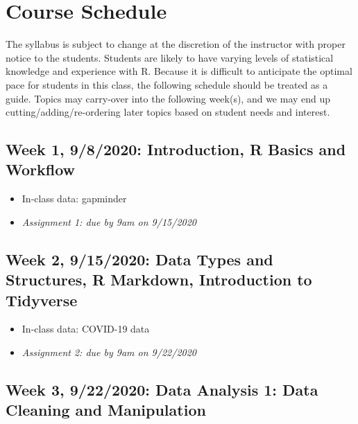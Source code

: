 \documentclass[11pt,]{article}
\providecommand{\tightlist}{%
  \setlength{\itemsep}{0pt}\setlength{\parskip}{0pt}}
\begin{document}
\hypertarget{course-schedule}{%
\section{Course Schedule}\label{course-schedule}}

The syllabus is subject to change at the discretion of the instructor
with proper notice to the students. Students are likely to have varying
levels of statistical knowledge and experience with R. Because it is
difficult to anticipate the optimal pace for students in this class, the
following schedule should be treated as a guide. Topics may carry-over
into the following week(s), and we may end up cutting/adding/re-ordering
later topics based on student needs and interest.

\hypertarget{week-1-982020-introduction-r-basics-and-workflow}{%
\subsection{Week 1, 9/8/2020: Introduction, R Basics and
Workflow}\label{week-1-982020-introduction-r-basics-and-workflow}}

\begin{itemize}
\tightlist
\item
  In-class data: gapminder
\item
  \emph{Assignment 1: due by 9am on 9/15/2020} \medskip
\end{itemize}

\hypertarget{week-2-9152020-data-types-and-structures-r-markdown-introduction-to-tidyverse}{%
\subsection{Week 2, 9/15/2020: Data Types and Structures, R Markdown,
Introduction to
Tidyverse}\label{week-2-9152020-data-types-and-structures-r-markdown-introduction-to-tidyverse}}

\begin{itemize}
\tightlist
\item
  In-class data: COVID-19 data
\item
  \emph{Assignment 2: due by 9am on 9/22/2020} \medskip
\end{itemize}

\hypertarget{week-3-9222020-data-analysis-1-data-cleaning-and-manipulation}{%
\subsection{Week 3, 9/22/2020: Data Analysis 1: Data Cleaning and
Manipulation}\label{week-3-9222020-data-analysis-1-data-cleaning-and-manipulation}}
\end{document}
